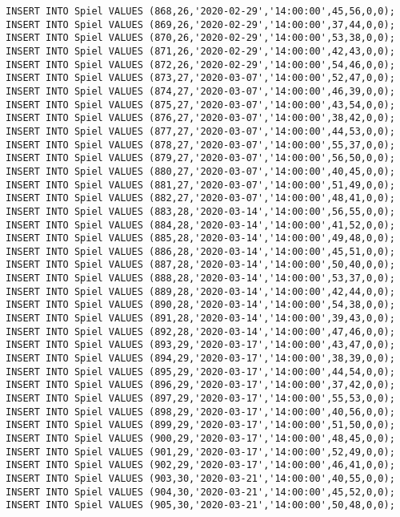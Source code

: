 \documentclass{lehramt-informatik-aufgabe}
\begin{document}
\begin{verbatim}
INSERT INTO Spiel VALUES (868,26,'2020-02-29','14:00:00',45,56,0,0);
INSERT INTO Spiel VALUES (869,26,'2020-02-29','14:00:00',37,44,0,0);
INSERT INTO Spiel VALUES (870,26,'2020-02-29','14:00:00',53,38,0,0);
INSERT INTO Spiel VALUES (871,26,'2020-02-29','14:00:00',42,43,0,0);
INSERT INTO Spiel VALUES (872,26,'2020-02-29','14:00:00',54,46,0,0);
INSERT INTO Spiel VALUES (873,27,'2020-03-07','14:00:00',52,47,0,0);
INSERT INTO Spiel VALUES (874,27,'2020-03-07','14:00:00',46,39,0,0);
INSERT INTO Spiel VALUES (875,27,'2020-03-07','14:00:00',43,54,0,0);
INSERT INTO Spiel VALUES (876,27,'2020-03-07','14:00:00',38,42,0,0);
INSERT INTO Spiel VALUES (877,27,'2020-03-07','14:00:00',44,53,0,0);
INSERT INTO Spiel VALUES (878,27,'2020-03-07','14:00:00',55,37,0,0);
INSERT INTO Spiel VALUES (879,27,'2020-03-07','14:00:00',56,50,0,0);
INSERT INTO Spiel VALUES (880,27,'2020-03-07','14:00:00',40,45,0,0);
INSERT INTO Spiel VALUES (881,27,'2020-03-07','14:00:00',51,49,0,0);
INSERT INTO Spiel VALUES (882,27,'2020-03-07','14:00:00',48,41,0,0);
INSERT INTO Spiel VALUES (883,28,'2020-03-14','14:00:00',56,55,0,0);
INSERT INTO Spiel VALUES (884,28,'2020-03-14','14:00:00',41,52,0,0);
INSERT INTO Spiel VALUES (885,28,'2020-03-14','14:00:00',49,48,0,0);
INSERT INTO Spiel VALUES (886,28,'2020-03-14','14:00:00',45,51,0,0);
INSERT INTO Spiel VALUES (887,28,'2020-03-14','14:00:00',50,40,0,0);
INSERT INTO Spiel VALUES (888,28,'2020-03-14','14:00:00',53,37,0,0);
INSERT INTO Spiel VALUES (889,28,'2020-03-14','14:00:00',42,44,0,0);
INSERT INTO Spiel VALUES (890,28,'2020-03-14','14:00:00',54,38,0,0);
INSERT INTO Spiel VALUES (891,28,'2020-03-14','14:00:00',39,43,0,0);
INSERT INTO Spiel VALUES (892,28,'2020-03-14','14:00:00',47,46,0,0);
INSERT INTO Spiel VALUES (893,29,'2020-03-17','14:00:00',43,47,0,0);
INSERT INTO Spiel VALUES (894,29,'2020-03-17','14:00:00',38,39,0,0);
INSERT INTO Spiel VALUES (895,29,'2020-03-17','14:00:00',44,54,0,0);
INSERT INTO Spiel VALUES (896,29,'2020-03-17','14:00:00',37,42,0,0);
INSERT INTO Spiel VALUES (897,29,'2020-03-17','14:00:00',55,53,0,0);
INSERT INTO Spiel VALUES (898,29,'2020-03-17','14:00:00',40,56,0,0);
INSERT INTO Spiel VALUES (899,29,'2020-03-17','14:00:00',51,50,0,0);
INSERT INTO Spiel VALUES (900,29,'2020-03-17','14:00:00',48,45,0,0);
INSERT INTO Spiel VALUES (901,29,'2020-03-17','14:00:00',52,49,0,0);
INSERT INTO Spiel VALUES (902,29,'2020-03-17','14:00:00',46,41,0,0);
INSERT INTO Spiel VALUES (903,30,'2020-03-21','14:00:00',40,55,0,0);
INSERT INTO Spiel VALUES (904,30,'2020-03-21','14:00:00',45,52,0,0);
INSERT INTO Spiel VALUES (905,30,'2020-03-21','14:00:00',50,48,0,0);

\end{verbatim}
\end{document}
